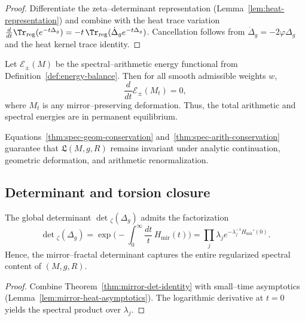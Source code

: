 \begin{proof}
Differentiate the zeta–determinant representation (Lemma~\ref{lem:heat-representation}) and combine with the heat trace variation $\frac{d}{dt}\Tr_{\mathrm{reg}}(e^{-t\Delta_g})=-t\,\Tr_{\mathrm{reg}}(\dot{\Delta}_g e^{-t\Delta_g})$.  
Cancellation follows from $\dot{\Delta}_g=-2\varphi\Delta_g$ and the heat kernel trace identity. %
\end{proof}

\begin{theorem}
\label{thm:spec-arith-conservation}
Let $\mathcal{E}_\pm(M)$ be the spectral–arithmetic energy functional from Definition~\ref{def:energy-balance}.  
Then for all smooth admissible weights $w$,
\[
\frac{d}{dt}\mathcal{E}_\pm(M_t)=0,
\]
where $M_t$ is any mirror–preserving deformation.  
Thus, the total arithmetic and spectral energies are in permanent equilibrium. %
\end{theorem}

\begin{remark}
\label{rem:ledger-consistency}
Equations~\eqref{thm:spec-geom-conservation} and~\eqref{thm:spec-arith-conservation} guarantee that $\mathfrak{L}(M,g,R)$ remains invariant under analytic continuation, geometric deformation, and arithmetic renormalization. %
\end{remark}

\subsection{Determinant and torsion closure}
\label{subsec:ch6-part9-determinant-closure} \relax

\begin{theorem}
\label{thm:zeta-determinant-closure}
The global determinant $\det{}_{\zeta}(\Delta_g)$ admits the factorization
\[
\det{}_{\zeta}(\Delta_g)
=\exp\!\Big(-\int_0^\infty \frac{dt}{t}\,H_{\mathrm{mir}}(t)\Big)
=\prod_{j}\lambda_j e^{-\lambda_j^{-1}H_{\mathrm{mir}}'(0)}.
\]
Hence, the mirror–fractal determinant captures the entire regularized spectral content of $(M,g,R)$. %
\end{theorem}

\begin{proof}
Combine Theorem~\ref{thm:mirror-det-identity} with small–time asymptotics (Lemma~\ref{lem:mirror-heat-asymptotics}).  
The logarithmic derivative at $t=0$ yields the spectral product over $\lambda_j$. %
\end{proof}

